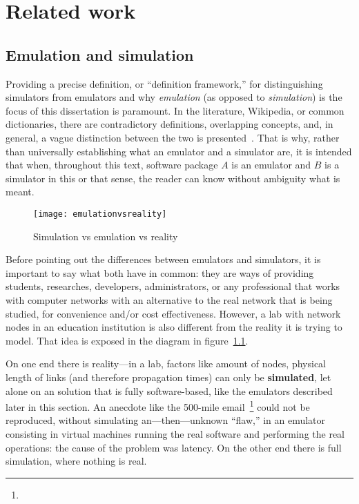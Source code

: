 
\chapter{Related work}
\label{ch:relatedwork}

\section{Emulation and simulation}
\label{sec:emulationsimulation}

Providing a precise definition, or ``definition framework,'' for distinguishing simulators from emulators and why \emph{emulation} (as opposed to \emph{simulation}) is the focus of this dissertation is paramount.
In the literature, Wikipedia, or common dictionaries, there are contradictory definitions, overlapping concepts, and, in general, a vague distinction between the two is presented~\cite{netsimoremu}. %
That is why, rather than universally establishing what an emulator and a simulator are, it is intended that when, throughout this text, software package $A$ is an emulator and $B$ is a simulator in this or that sense, the reader can know without ambiguity what is meant.

\begin{figure}
  \centering
  \texttt{[image: emulationvsreality]}
  \caption{Simulation vs emulation vs reality}
  \label{fig:emulationvsreality}
\end{figure}

Before pointing out the differences between emulators and simulators, it is important to say what both have in common: they are ways of providing students, researches, developers, administrators, or any professional that works with computer networks with an alternative to the real network that is being studied, for convenience and/or cost effectiveness.
However, a lab with network nodes in an education institution is also different from the reality it is trying to model. That idea is exposed in the diagram in figure~\ref{fig:emulationvsreality}.

On one end there is reality---in a lab, factors like amount of nodes, physical length of links (and therefore propagation times) can only be \textbf{simulated}, let alone on an solution that is fully software-based, like the emulators described later in this section.
An anecdote like the 500-mile email~\footnote{} could not be reproduced, without simulating an---then---unknown ``flaw,'' in an emulator consisting in virtual machines running the real software and performing the real operations: the cause of the problem was latency.
On the other end there is full simulation, where nothing is real.

